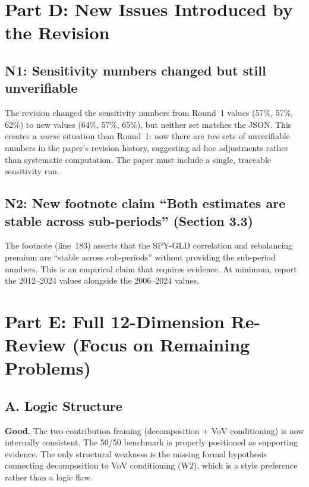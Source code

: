 \documentclass[12pt,a4paper]{article}
\begin{document}
\section*{Part D: New Issues Introduced by the Revision}

\subsection*{\textcolor{warncolor}{N1: Sensitivity numbers changed but still unverifiable}}

The revision changed the sensitivity numbers from Round~1 values (57\%, 57\%, 62\%) to new values (64\%, 57\%, 65\%), but neither set matches the JSON. This creates a \emph{worse} situation than Round~1: now there are \emph{two} sets of unverifiable numbers in the paper's revision history, suggesting ad hoc adjustments rather than systematic computation. The paper must include a single, traceable sensitivity run.

\subsection*{\textcolor{warncolor}{N2: New footnote claim ``Both estimates are stable across sub-periods'' (Section 3.3)}}

The footnote (line~183) asserts that the SPY-GLD correlation and rebalancing premium are ``stable across sub-periods'' without providing the sub-period numbers. This is an empirical claim that requires evidence. At minimum, report the 2012--2024 values alongside the 2006--2024 values.

\section*{Part E: Full 12-Dimension Re-Review (Focus on Remaining Problems)}

\subsection*{A. Logic Structure}

\textcolor{okgreen}{\textbf{Good.}} The two-contribution framing (decomposition + VoV conditioning) is now internally consistent. The 50/50 benchmark is properly positioned as supporting evidence. The only structural weakness is the missing formal hypothesis connecting decomposition to VoV conditioning (W2), which is a style preference rather than a logic flaw.
\end{document}
